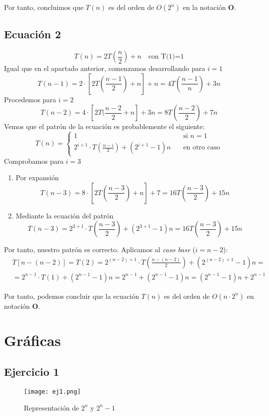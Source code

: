 \documentclass[12pt,spanish]{article}
\begin{document}
\begin{center}
Por tanto, concluimos que $T(n)$ es del orden de $O(2^{n})$ en la notación \textbf{O}.
\end{center}

\subsection{Ecuación 2}
\[T(n)=2T(\frac{n}{2})+n \quad \text{con T(1)=1}\]
Igual que en el apartado anterior, comenzamos desarrollando para $i=1$
\[T(n-1)=2 \cdot \left[2T(\frac{n-1}{2})+n\right]+n=4T(\frac{n-1}{n})+3n \]
Procedemos para $i=2$
\[T(n-2)=4 \cdot \left[2T(\frac{n-2}{2}+n\right]+3n=8T(\frac{n-2}{2})+7n \]
Vemos que el patrón de la ecuación es probablemente el siguiente: 
\[T(n)=
\begin{cases}
	1 & \quad \text{si } n = 1  \\
	2^{i+1} \cdot T(\frac{n-i}{2}) + (2^{i+1}-1)n & \quad \text{en otro caso}
\end{cases}
\]
Comprobamos para $i=3$
\begin{enumerate}
\item Por expansión
\[ T(n-3)=8 \cdot \left[2T(\frac{n-3}{2})+n\right]+7=16T(\frac{n-3}{2})+15n\]
\item Mediante la ecuación del patrón
\[ T(n-3)=2^{3+1} \cdot T(\frac{n-3}{2}) + (2^{3+1} - 1)n = 16T(\frac{n-3}{2})+15n \]
\end{enumerate}
Por tanto, nuestro patrón es correcto.
Aplicamos al \textit{caso base} ($i=n-2$):
\begin{equation}
\begin{split}
&T\left[n-(n-2)\right]=T(2)=2^{(n-2)+1} \cdot T(\frac{n-(n-2)}{2})+(2^{(n-2)+1}-1)n= \\
&= 2^{n-1} \cdot T(1) + (2^{n-1}-1)n = 2^{n-1} + (2^{n-1}-1)n = (2^{n-1}-1)n +2^{n-1} 
\end{split}
\end{equation}
\begin{center}
Por tanto, podemos concluir que la ecuación $T(n)$ es del orden de $O(n \cdot
2^{n})$ en notación \textbf{O}.
\end{center}
\section{Gráficas}
\subsection{Ejercicio 1}
\begin{figure}[H]
\centering
\texttt{[image: ej1.png]}
\caption{Representación de $2^{n}$ y $2^{n}-1$}
\end{figure}
\end{document}
